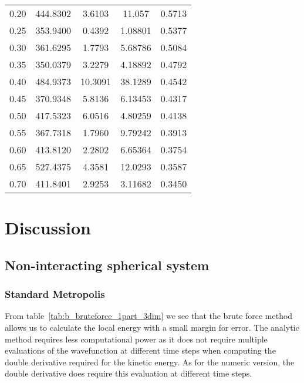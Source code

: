\documentclass[
    a4paper, aps, twocolumn, floatfix, superscriptaddress,
    nofootinbib]{revtex4-1}
\begin{document}
\begin{table}[h]
{\begin{ruledtabular}
\begin{tabular}{ccccc}
0.20     & 444.8302 & 3.6103   & 11.057     & 0.5713      \\
0.25     & 353.9400 & 0.4392   & 1.08801    & 0.5377      \\
0.30     & 361.6295 & 1.7793   & 5.68786    & 0.5084      \\
0.35     & 350.0379 & 3.2279   & 4.18892    & 0.4792      \\
0.40     & 484.9373 & 10.3091  & 38.1289    & 0.4542      \\
0.45     & 370.9348 & 5.8136   & 6.13453    & 0.4317      \\
0.50     & 417.5323 & 6.0516   & 4.80259    & 0.4138      \\
0.55     & 367.7318 & 1.7960   & 9.79242    & 0.3913      \\
0.60     & 413.8120 & 2.2802   & 6.65364    & 0.3754      \\
0.65     & 527.4375 & 4.3581   & 12.0293    & 0.3587      \\
0.70     & 411.8401 & 2.9253   & 3.11682    & 0.3450     \\
\end{tabular}
\end{ruledtabular}
}
\end{table}






\section{Discussion}
\subsection{Non-interacting spherical system}
\subsubsection{Standard Metropolis}
From table~\ref{tab:b_bruteforce_1part_3dim} we see that the brute force method allows us to calculate the local energy with a small margin for error. The analytic method requires less computational power as it does not require multiple evaluations of the wavefunction at different time steps when computing the double derivative required for the kinetic energy. As for the numeric version, the double derivative does require this evaluation at different time steps.
\end{document}
